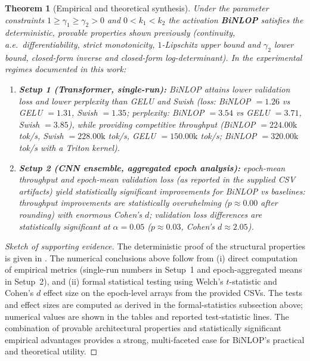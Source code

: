 \documentclass[11pt, twoside, openright, english]{article}
\numberwithin{equation}{section}
\theoremstyle{plain}
\newtheorem{theorem}{Theorem}[section]
\theoremstyle{definition}
\theoremstyle{remark}
\begin{document}
\begin{theorem}[Empirical and theoretical synthesis]
Under the parameter constraints $1\ge \gamma_1\ge \gamma_2>0$ and $0<k_1<k_2$ the activation \textbf{BiNLOP} satisfies the deterministic, provable properties shown previously (continuity, a.e.\ differentiability, strict monotonicity, $1$-Lipschitz upper bound and $\gamma_2$ lower bound, closed-form inverse and closed-form log-determinant). In the experimental regimes documented in this work:
\begin{enumerate}
  \item \textbf{Setup 1 (Transformer, single-run):} BiNLOP attains lower validation loss and lower perplexity than GELU and Swish (loss: BiNLOP $=1.26$ vs GELU $=1.31$, Swish $=1.35$; perplexity: BiNLOP $=3.54$ vs GELU $=3.71$, Swish $=3.85$), while providing competitive throughput (BiNLOP $=224.00\text{k}$ tok/s, Swish $=228.00\text{k}$ tok/s, GELU $=150.00\text{k}$ tok/s; BiNLOP $=320.00\text{k}$ tok/s with a Triton kernel).
  \item \textbf{Setup 2 (CNN ensemble, aggregated epoch analysis):} epoch-mean throughput and epoch-mean validation loss (as reported in the supplied CSV artifacts) yield statistically significant improvements for BiNLOP vs baselines: throughput improvements are statistically overwhelming ($p\approx 0.00$ after rounding) with enormous Cohen's $d$; validation loss differences are statistically significant at $\alpha=0.05$ ($p \approx 0.03$, Cohen's $d \approx 2.05$).
\end{enumerate}
\end{theorem}

\begin{proof}[Sketch of supporting evidence]
The deterministic proof of the structural properties is given in . The numerical conclusions above follow from (i) direct computation of empirical metrics (single-run numbers in Setup~1 and epoch-aggregated means in Setup~2), and (ii) formal statistical testing using Welch's $t$-statistic and Cohen's $d$ effect size on the epoch-level arrays from the provided CSVs. The tests and effect sizes are computed as derived in the formal-statistics subsection above; numerical values are shown in the tables and reported test-statistic lines. The combination of provable architectural properties and statistically significant empirical advantages provides a strong, multi-faceted case for BiNLOP's practical and theoretical utility.
\end{proof}
\end{document}
